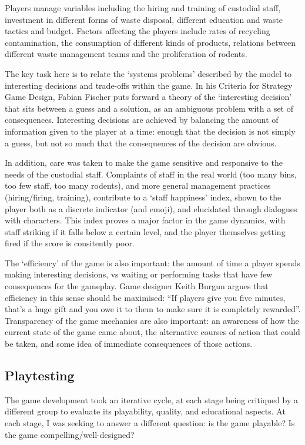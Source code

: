 \documentclass[nofonts,nols,justified,nobib]{tufte-book}
\begin{document}
Players manage variables including the hiring and training of custodial staff, investment in different forms of waste disposal, different education and waste tactics and budget. Factors affecting the players include rates of recycling contamination, the consumption of different kinds of products, relations between different waste management teams and the proliferation of rodents.

The key task here is to relate the `systems problems' described by the model to interesting decisions and trade-offs within the game. In his Criteria for Strategy Game Design, Fabian Fischer \cite{fischer_criteria_2014} puts forward a theory of the `interesting decision' that sits between a guess and a solution, as an ambiguous problem with a set of consequences. Interesting decisions are achieved by balancing the amount of information given to the player at a time: enough that the decision is not simply a guess, but not so much that the consequences of the decision are obvious.

In addition, care was taken to make the game sensitive and responsive to the needs of the custodial staff. Complaints of staff in the real world (too many bins, too few staff, too many rodents), and more general management practices (hiring/firing, training), contribute to a `staff happiness' index, shown to the player both as a discrete indicator (and emoji), and elucidated through dialogues with characters. This index proves a major factor in the game dynamics, with staff striking if it falls below a certain level, and the player themselves getting fired if the score is consitently poor.

The `efficiency' of the game is also important: the amount of time a player spends making interesting decisions, vs waiting or performing tasks that have few consequences for the gameplay. Game designer Keith Burgun argues that efficiency in this sense should be maximised: ``If players give you five minutes, that's a huge gift and you owe it to them to make sure it is completely rewarded''. Transparency of the game mechanics are also important: an awareness of how the current state of the game came about, the alternative courses of action that could be taken, and some idea of immediate consequences of those actions. 

\subsection*{Playtesting}

The game development took an iterative cycle, at each stage being critiqued by a different group to evaluate its playability, quality, and educational aspects. At each stage, I was seeking to answer a different question: is the game playable? Is the game compelling/well-designed? 
\end{document}

